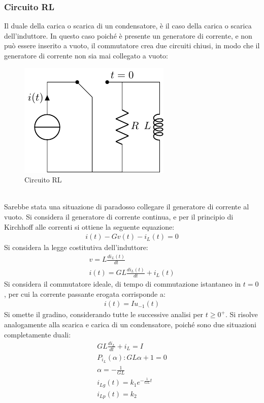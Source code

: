 \documentclass{article}
\numberwithin{equation}{subsection}
\begin{document}
\subsubsection{Circuito RL}
Il duale della carica o scarica di un condensatore, è il caso della carica o scarica dell'induttore. In questo caso poiché è presente un generatore di corrente, e non 
può essere inserito a vuoto, il commutatore crea due circuiti chiusi, in modo che il generatore di corrente non sia mai collegato a vuoto:
\begin{figure}[ht]%
    \centering
    \includegraphics{circuito-rl-tempo-continuo.pdf}
    \caption{Circuito RL}
    \label{fig:circuito-rl}
\end{figure}
\\
Sarebbe stata una situazione di paradosso collegare il generatore di corrente al vuoto. Si considera il generatore di corrente continua, e per il principio di Kirchhoff alle 
correnti si ottiene la seguente equazione:
\begin{gather*}
    i(t)-Gv(t)-i_L(t)=0
\end{gather*}
Si considera la legge costitutiva dell'induttore:
\begin{gather*}
    v=L\displaystyle\frac{di_L(t)}{dt}\\
    i(t)=GL\displaystyle\frac{di_L(t)}{dt}+i_L(t)
\end{gather*}
Si considera il commutatore ideale, di tempo di commutazione istantaneo in $t=0$, per cui la corrente passante erogata corrisponde a:
\begin{gather*}
    i(t)=Iu_{-1}(t)
\end{gather*}
Si omette il gradino, considerando tutte le successive analisi per $t\geq0^+$. Si risolve analogamente alla scarica e carica di un condensatore, poiché sono due situazioni 
completamente duali:
\begin{gather*}
    GL\displaystyle\frac{di_L}{dt}+i_L=I\\
    P_{i_L}(\alpha):GL\alpha+1=0\\
    \alpha=\displaystyle-\frac{1}{GL}\\
    i_{Lg}(t)=k_1e^{-\frac{1}{GL}t}\\
    i_{Lp}(t)=k_2
\end{gather*}
\end{document}
